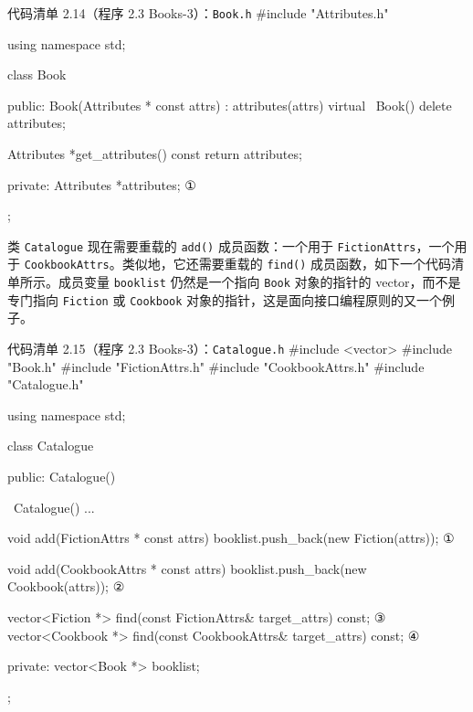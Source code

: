 \begin{codeboxt}{代码清单 2.14（程序 2.3 Books-3）：\texttt{Book.h}}
#include "Attributes.h"

using namespace std;

class Book
{
public:
    Book(Attributes * const attrs) : attributes(attrs) {}
    virtual ~Book() { delete attributes; }

    Attributes *get_attributes() const { return attributes; }

private:
    Attributes *attributes;      ①
};
\end{codeboxt}
\par

类 \texttt{Catalogue} 现在需要重载的 \texttt{add()} 成员函数：一个用于 \texttt{Fiction\allowbreak{}Attrs}，一个用于 \texttt{Cookbook\allowbreak{}Attrs}。类似地，它还需要重载的 \texttt{find()} 成员函数，如下一个代码清单所示。成员变量 \texttt{booklist} 仍然是一个指向 \texttt{Book} 对象的指针的 vector，而不是专门指向 \texttt{Fiction} 或 \texttt{Cookbook} 对象的指针，这是面向接口编程原则的又一个例子。

\begin{codeboxt}{代码清单 2.15（程序 2.3 Books-3）：\texttt{Catalogue.\allowbreak{}h}}
#include <vector>
#include "Book.h"
#include "FictionAttrs.h"
#include "CookbookAttrs.h"
#include "Catalogue.h"

using namespace std;

class Catalogue
{
public:
    Catalogue() {}

    ~Catalogue() ...

    void add(FictionAttrs * const attrs)
    {
        booklist.push_back(new Fiction(attrs));            ①
    }

    void add(CookbookAttrs * const attrs)
    {
        booklist.push_back(new Cookbook(attrs));           ②
    }

    vector<Fiction  *> find(const FictionAttrs&  
                                  target_attrs) const;     ③
    vector<Cookbook *> find(const CookbookAttrs& 
                                  target_attrs) const;     ④

private:
    vector<Book *> booklist;
};
\end{codeboxt}
\par
{}\par
{}\par
{}\par

